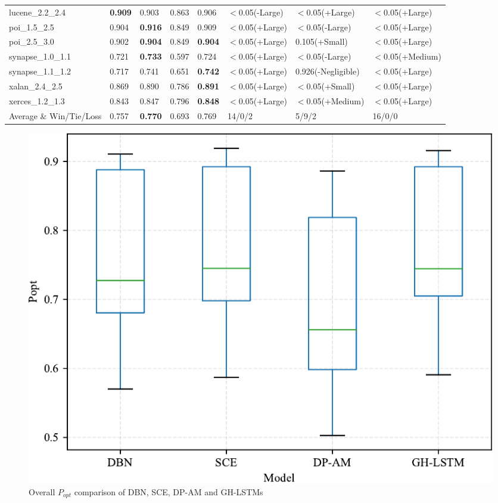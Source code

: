 \documentclass[journal]{IEEEtran}
\begin{document}
\begin{table}[t]
\begin{tabular}{m{2cm}|llll|lll}
		lucene\_2.2\_2.4  &\textbf{0.909}&0.903     &0.863     &0.906     &$<$0.05(-Large)&$<$0.05(+Large)&$<$0.05(+Large)\\
		poi\_1.5\_2.5     &0.904     &\textbf{0.916}&0.849     &0.909     &$<$0.05(+Large)&$<$0.05(-Large)&$<$0.05(+Large)\\
		poi\_2.5\_3.0     &0.902     &\textbf{0.904}&0.849     &\textbf{0.904}&$<$0.05(+Large)&0.105(+Small)&$<$0.05(+Large)\\
		synapse\_1.0\_1.1 &0.721     &\textbf{0.733}&0.597     &0.724     &$<$0.05(+Large)&$<$0.05(-Large)&$<$0.05(+Medium)\\
		synapse\_1.1\_1.2 &0.717     &0.741     &0.651     &\textbf{0.742}&$<$0.05(+Large)&0.926(-Negligible)&$<$0.05(+Large)\\
		xalan\_2.4\_2.5   &0.869     &0.890     &0.786     &\textbf{0.891}&$<$0.05(+Large)&$<$0.05(+Small)&$<$0.05(+Large)\\
		xerces\_1.2\_1.3  &0.843     &0.847     &0.796     &\textbf{0.848}&$<$0.05(+Large)&$<$0.05(+Medium)&$<$0.05(+Large)\\\midrule
		Average $\&$ Win/Tie/Loss&0.757&\textbf{0.770}&0.693&0.769&14/0/2&5/9/2&16/0/0\\
		\bottomrule
	\end{tabular}
\end{table}

\begin{figure}[htbp]
	\centering
	\includegraphics[scale=0.6]{figs/box_Popt.pdf}
	\caption{Overall $P_{opt}$ comparison of DBN, SCE, DP-AM and GH-LSTMs}
	\label{fig_box_Popt}
\end{figure}
\end{document}
